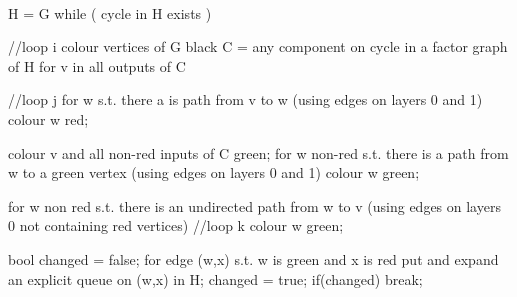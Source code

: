 \ \
\begin{samepage}
\begin{code}
  H = G
while ( cycle in H exists )     
{ //loop i
  colour vertices of G black
  C = any component on cycle in a factor graph of H
  for v in all outputs of C     
  { //loop j
    for w s.t. there a is path from v to w 
    (using edges on layers 0 and 1)
    {
      colour w red;
    }

    colour v and all non-red inputs of C green;
    for w non-red s.t. there is a path from w to a green vertex
    (using edges on layers 0 and 1)
    {
      colour w green;
    }

    for w non red s.t. there is an undirected path from w to v
    (using edges on layers 0 not containing red vertices)
    { //loop k
      colour w green;
    }

    bool changed = false;
    for edge (w,x) s.t. w is green and x is red
    {
      put and expand an explicit queue on (w,x) in H;
      changed = true;
    }
    if(changed)
      break;
  }
}
\end{code}
\end{samepage}
\myendalg

